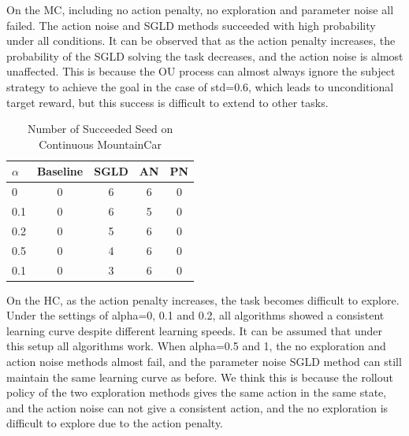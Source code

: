 On the MC, including no action penalty, no exploration and parameter noise all failed. The action noise and SGLD methods succeeded with high probability under all conditions. It can be observed that as the action penalty increases, the probability of the SGLD solving the task decreases, and the action noise is almost unaffected. This is because the OU process can almost always ignore the subject strategy to achieve the goal in the case of std=0.6, which leads to unconditional target reward, but this success is difficult to extend to other tasks.

\begin{table}[htbp]
   \caption{Number of Succeeded Seed on Continuous MountainCar}
   \label{tab:mc}
   \vskip 0.15in
   \begin{center}
   \begin{tabular}{lcccc}
   \toprule
   $\alpha$ & Baseline & SGLD & AN & PN \\
   \midrule
      0     & 0        & 6    & 6  & 0 \\
      0.1   & 0        & 6    & 5  & 0 \\
      0.2   & 0        & 5    & 6  & 0 \\
      0.5   & 0        & 4    & 6  & 0 \\
      0.1   & 0        & 3    & 6  & 0 \\
   \bottomrule
   \end{tabular}
   \end{center}
   \vskip -0.1in
   \end{table}

On the HC, as the action penalty increases, the task becomes difficult to explore. Under the settings of alpha=0, 0.1 and 0.2, all algorithms showed a consistent learning curve despite different learning speeds. It can be assumed that under this setup all algorithms work. When alpha=0.5 and 1, the no exploration and action noise methods almost fail, and the parameter noise SGLD method can still maintain the same learning curve as before. We think this is because the rollout policy of the two exploration methods gives the same action in the same state, and the action noise can not give a consistent action, and the no exploration is difficult to explore due to the action penalty.

